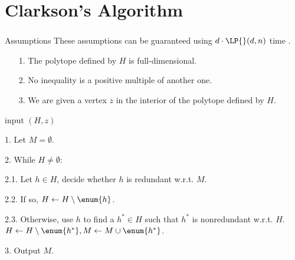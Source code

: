 \section{Clarkson's Algorithm}
\begin{frame}\frametitle{\insertsection}\justifying
\begin{ebox}{Assumptions}
These assumptions can be guaranteed using \(d\cdot\LP{}(d,n)\) time
\cite{fukuda:2015}.
\begin{itemize}
\item[{\color{SpringGreen4}1.}] The polytope defined by \(H\) is full-dimensional.
\item[{\color{SpringGreen4}2.}] No inequality is a positive multiple of another one.
\item[{\color{SpringGreen4}3.}] We are given a vertex \(z\) in the interior of the polytope defined by \(H\).
\end{itemize}
\end{ebox}
\pause
\begin{algo}
\item[input] \((H, z)\)
\item[1.] Let \(M = \emptyset\).
\item[2.] While \(H \neq \emptyset\):
\item[2.1.] Let \(h \in H\), decide whether \(h\) is redundant w.r.t. \(M\).
\item[2.2.] If so, \(H \gets H \setminus \enum{h}\).
\item[2.3.] Otherwise, use \(h\) to find a \(h^* \in H\) such that \(h^*\) is
nonredundant w.r.t. \(H\). \(H \gets H \setminus \enum{h^*}, M
\gets M \cup \enum{h^*}\).
\item[3.] Output \(M\).
\end{algo}
\end{frame}

